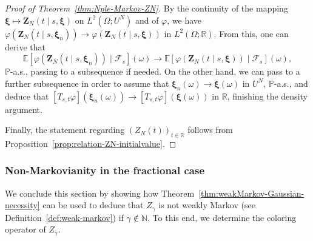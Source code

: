 \documentclass[reqno]{amsart}
\numberwithin{equation}{section}
\newcommand{\bbP}{\mathbb{P}}
\newcommand{\bbR}{\mathbb{R}}
\newcommand{\R}{\mathbb{R}}
\newcommand{\N}{\mathbb{N}}
\newcommand{\E}{\mathbb{E}}
\newcommand{\cF}{\mathcal{F}}
\theoremstyle{remark}
\theoremstyle{definition}
\begin{document}
\begin{proof}[Proof of Theorem~\ref{thm:Nple-Markov-ZN}]
	By the continuity of the mapping
	$\bm\xi \mapsto \mathbf Z_N(t\mid s, \bm\xi)$ on $L^2(\Omega; U^N)$
	and of $\varphi$,
	we have ${\varphi(\mathbf Z_N(t\mid s, \bm\xi_n)) \to \varphi(\mathbf Z_N(t\mid s, \bm\xi))}$
	in $L^2(\Omega; \R)$. From this, one can derive that
	\[
	\E[\varphi(\mathbf Z_N(t\mid s, \bm \xi_n)) \mid \cF_{s}](\omega) \to \E[\varphi(\mathbf Z_N(t\mid s, \bm \xi)) \mid \cF_{s}](\omega),
	\]
	$\bbP$-a.s., passing to a subsequence if needed.
	On the other hand, we can pass to a further subsequence
	in order to assume that $\bm \xi_n(\omega) \to \bm \xi(\omega)$ in $U^N$, $\bbP$-a.s., 
	and deduce that $[T_{s, t}\varphi](\bm\xi_n(\omega)) \to [T_{s, t}\varphi](\bm\xi(\omega))$ in $\bbR$,
	finishing the density argument.
	
	Finally, the statement regarding $(Z_N(t))_{t\in\bbR}$ follows from Proposition~\ref{prop:relation-ZN-initialvalue}.
\end{proof}

\subsubsection{Non-Markovianity in the fractional case}
\label{subsec:not-Markov-fractional}
We conclude this section by showing how 
Theorem~\ref{thm:weakMarkov-Gaussian-necessity} can be used
to deduce that $Z_\gamma$ is not weakly Markov (see Definition~\ref{def:weak-markov})
if $\gamma \not\in\N$. To this end, we determine
the coloring operator of $Z_\gamma$.
\end{document}
